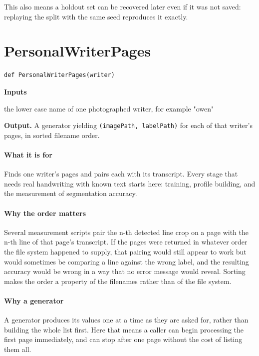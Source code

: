 This also means a holdout set can be recovered later even if it was not saved: replaying the split with the same seed reproduces it exactly.


\section{PersonalWriterPages}
\begin{lstlisting}[style=sig]
def PersonalWriterPages(writer)
\end{lstlisting}

\noindent\textbf{Inputs}
\begin{description}[leftmargin=2.2em,style=nextline,font=\normalfont\ttfamily]\setlength\itemsep{1pt}
  \item[{writer}] \normalfont the lower case name of one photographed writer, for example "owen"
\end{description}

\noindent\textbf{Output.} A generator yielding \texttt{(imagePath, labelPath)} for each of that writer's pages, in sorted filename order.


\paragraph{What it is for}
Finds one writer's pages and pairs each with its transcript. Every stage that needs real handwriting with known text starts here: training, profile building, and the measurement of segmentation accuracy.


\paragraph{Why the order matters}
Several measurement scripts pair the n-th detected line crop on a page with the n-th line of that page's transcript. If the pages were returned in whatever order the file system happened to supply, that pairing would still appear to work but would sometimes be comparing a line against the wrong label, and the resulting accuracy would be wrong in a way that no error message would reveal. Sorting makes the order a property of the filenames rather than of the file system.


\paragraph{Why a generator}
A generator produces its values one at a time as they are asked for, rather than building the whole list first. Here that means a caller can begin processing the first page immediately, and can stop after one page without the cost of listing them all.

